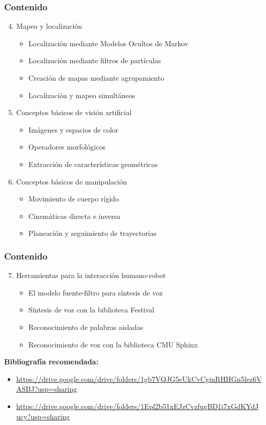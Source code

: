 \begin{frame}\frametitle{Contenido}
  \begin{enumerate}
    \setcounter{enumi}{3}
  \item Mapeo y localización
    \begin{itemize}
    \item Localización mediante Modelos Ocultos de Markov
    \item Localización mediante filtros de partículas
    \item Creación de mapas mediante agrupamiento
    \item Localización y mapeo simultáneos
    \end{itemize}
  \item Conceptos básicos de visión artificial
    \begin{itemize}
    \item Imágenes y espacios de color
    \item Operadores morfológicos
    \item Extracción de características geométricas
    \end{itemize}
  \item Conceptos básicos de manipulación
    \begin{itemize}
    \item Movimiento de cuerpo rígido
    \item Cinemáticas directa e inversa
    \item Planeación y seguimiento de trayectorias
    \end{itemize}
  \end{enumerate}
\end{frame}

\begin{frame}\frametitle{Contenido}
  \begin{enumerate}
    \setcounter{enumi}{6}
  \item Herramientas para la interacción humano-robot
    \begin{itemize}
    \item El modelo fuente-filtro para síntesis de voz
    \item Síntesis de voz con la biblioteca Festival
    \item Reconocimiento de palabras aisladas
    \item Reconocimiento de voz con la biblioteca CMU Sphinx
    \end{itemize}
  \end{enumerate}
  \textbf{Bibliografía recomendada:}
  \begin{itemize}
    \item \url{https://drive.google.com/drive/folders/1gb7VQJG5eUkCvCginRHHGn5lez6VASBJ?usp=sharing}
    \item \url{https://drive.google.com/drive/folders/1Epl2b51xEJzCvzfugBD1i7xGdKYdJucy?usp=sharing}
  \end{itemize}
  
\end{frame}

